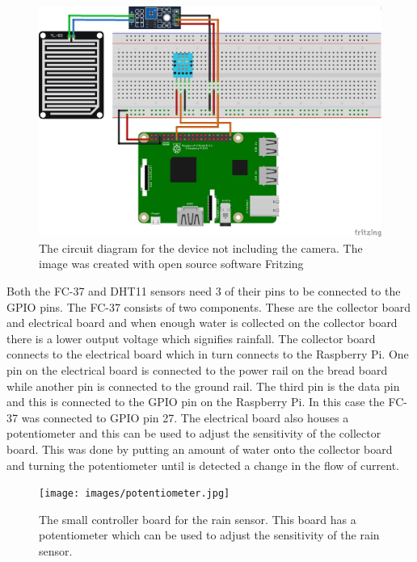 \documentclass[10pt,a4paper]{article}
\begin{document}
\begin{figure}[H]
    \centering
      \includegraphics[width=\linewidth]{images/circuitDiagram.png}
      \caption{The circuit diagram for the device not including the camera. The image was created with open source software Fritzing}
      \label{fig:circuitDiagram}
  \end{figure}

Both the FC-37 and DHT11 sensors need 3 of their pins to be connected to the GPIO pins. The FC-37 consists of two components. These are the collector board and electrical board and when enough water is collected on the collector board there is a lower output voltage which signifies rainfall. The collector board connects to the electrical board which in turn connects to the Raspberry Pi. One pin on the electrical board is connected to the power rail on the bread board while another pin is connected to the ground rail. The third pin is the data pin and this is connected to the GPIO pin on the Raspberry Pi. In this case the FC-37 was connected to GPIO pin 27. The electrical board also houses a potentiometer and this can be used to adjust the sensitivity of the collector board. This was done by putting an amount of water onto the collector board and turning the potentiometer until is detected a change in the flow of current.

\begin{figure}[H]
  \centering
    \texttt{[image: images/potentiometer.jpg]}
    \caption{The small controller board for the rain sensor. This board has a potentiometer which can be used to adjust the sensitivity of the rain sensor.}
    \label{fig:potentiometer}
\end{figure}
\end{document}
